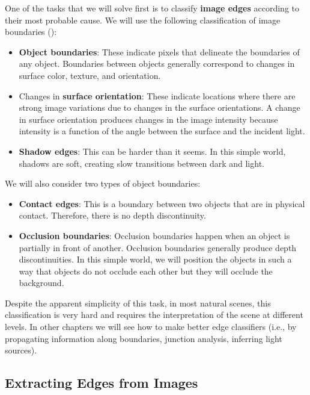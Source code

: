 One of the tasks that we will solve first is to classify {\bf image edges} according to their most probable cause. We will use the following classification of image boundaries (\fig{\ref{fig:edgeLabeling}}):
\begin{itemize}
\item {\bf Object boundaries}: These indicate pixels that delineate the boundaries of any object. Boundaries between objects generally correspond to changes in surface color, texture, and orientation. 

\item Changes in {\bf surface orientation}: These indicate locations where there are strong image variations due to changes in the surface orientations. A change in surface orientation produces changes in the image intensity because intensity is a function of the angle between the surface and the incident light.  

\item {\bf Shadow edges}: This can be harder than it seems. In this simple world, shadows are soft, creating slow transitions between dark and light.
\end{itemize}

We will also consider two types of object boundaries:
\begin{itemize}
\item {\bf Contact edges}: This is a boundary between two objects that are in physical contact. Therefore, there is no depth discontinuity. 

\item {\bf Occlusion boundaries}: Occlusion boundaries happen when an object is partially in front of another. Occlusion boundaries generally produce depth discontinuities. In this simple world, we will position the objects in such a way that objects do not occlude each other but they will occlude the background.
\end{itemize}

Despite the apparent simplicity of this task, in most natural scenes, this classification is very hard and requires the interpretation of the scene at different levels. In other chapters we will see how to make better edge classifiers (i.e., by propagating information along boundaries, junction analysis, inferring light sources).


\subsection{Extracting Edges from Images}

